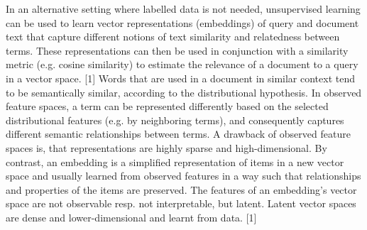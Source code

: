 In an alternative setting where labelled data is not needed, unsupervised learning can be used to learn vector representations (embeddings) of query and document text that capture different notions of text similarity and relatedness between terms.
These representations can then be used in conjunction with a similarity metric (e.g. cosine similarity) to estimate the relevance of a document to a query in a vector space. [1]
Words that are used in a document in similar context tend to be semantically similar, according to the distributional hypothesis.
In observed feature spaces, a term can be represented differently based on the selected distributional features (e.g. by neighboring terms), and consequently captures different semantic relationships between terms.
A drawback of observed feature spaces is, that representations are highly sparse and high-dimensional.
By contrast, an embedding is a simplified representation of items in a new vector space and usually learned from observed features in a way such that relationships and properties of the items are preserved.
The features of an embedding’s vector space are not observable resp. not interpretable, but latent.
Latent vector spaces are dense and lower-dimensional and learnt from data. [1]

